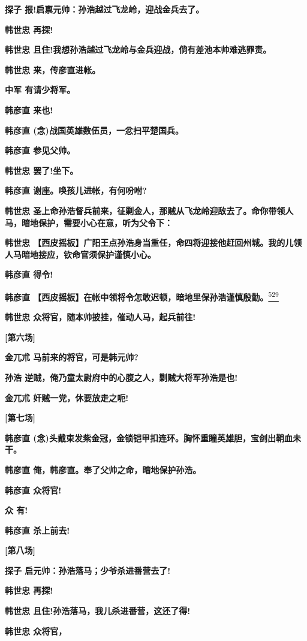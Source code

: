 \textbf{探子 报!启禀元帅：孙浩越过飞龙岭，迎战金兵去了。}

\textbf{韩世忠 再探!}

\textbf{韩世忠
且住!我想孙浩越过飞龙岭与金兵迎战，倘有差池本帅难逃罪责。}

\textbf{韩世忠 来，传彦直进帐。}

\textbf{中军 有请少将军。}

\textbf{韩彦直 来也!}

\textbf{韩彦直 (念)战国英雄数伍员，一忿扫平楚国兵。}

\textbf{韩彦直 参见父帅。}

\textbf{韩世忠 罢了!坐下。}

\textbf{韩彦直 谢座。唤孩儿进帐，有何吩咐?}

\textbf{韩世忠
圣上命孙浩督兵前来，征剿金人，那贼从飞龙岭迎敌去了。命你带领人马，暗地保护，需要小心在意，听为父令下：}

\textbf{韩世忠
【西皮摇板】广阳王点孙浩身当重任，命四将迎接他赶回州城。我的儿领人马暗地接应，钦命官须保护谨慎小心。}

\textbf{韩彦直 得令!}

\textbf{韩彦直
【西皮摇板】在帐中领将令怎敢迟顿，暗地里保孙浩谨慎殷勤。}\protect\hyperlink{fn529}{\textsuperscript{529}}

\textbf{韩世忠 众将官，随本帅披挂，催动人马，起兵前往!}

\textbf{{[}第六场{]}}

\textbf{金兀朮 马前来的将官，可是韩元帅?}

\textbf{孙浩 逆贼，俺乃童太尉府中的心腹之人，剿贼大将军孙浩是也!}

\textbf{金兀朮 奸贼一党，休要放走之呃!}

\textbf{{[}第七场{]}}

\textbf{韩彦直
(念)头戴束发紫金冠，金锁铠甲扣连环。胸怀重瞳英雄胆，宝剑出鞘血未干。}

\textbf{韩彦直 俺，韩彦直。奉了父帅之命，暗地保护孙浩。}

\textbf{韩彦直 众将官!}

\textbf{众 有!}

\textbf{韩彦直 杀上前去!}

\textbf{{[}第八场{]}}

\textbf{探子 启元帅：孙浩落马；少爷杀进番营去了!}

\textbf{韩世忠 再探!}

\textbf{韩世忠 且住!孙浩落马，我儿杀进番营，这还了得!}

\textbf{韩世忠 众将官，}

